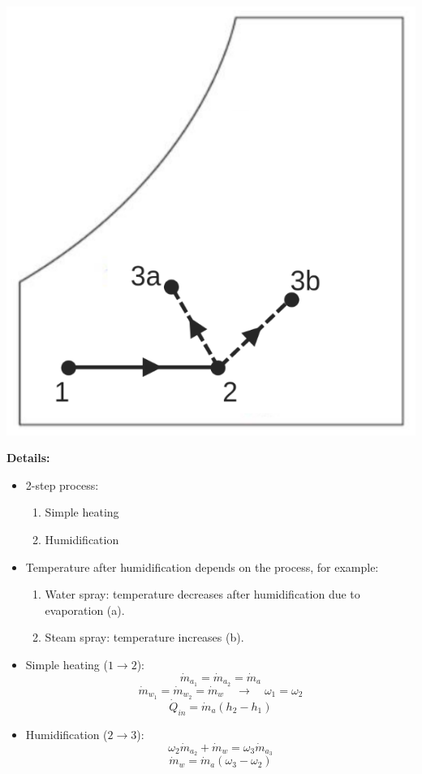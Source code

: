 \documentclass[11pt]{article}
\begin{document}
\begin{center}
\includegraphics[scale=0.8]{./images/heating-with-humidification-psychrometric-chart.png}
\end{center}

\textbf{Details:}
\begin{itemize}
\item 2-step process:
\begin{enumerate}
\item Simple heating
\item Humidification
\end{enumerate}
\item Temperature after humidification depends on the process, for example:
\begin{enumerate}
\item Water spray: temperature decreases after humidification due to evaporation (a).
\item Steam spray: temperature increases (b).
\end{enumerate}
\item Simple heating (\(1 \rightarrow 2\)):
\[\dot{m}_{a_1} = \dot{m}_{a_2} = \dot{m}_a\]
\[\dot{m}_{w_1} = \dot{m}_{w_2} = \dot{m}_w \quad \rightarrow \quad \omega_1 = \omega_2\]
\[\dot{Q}_{in} = \dot{m}_a (h_2 - h_1)\]
\item Humidification (\(2 \rightarrow 3\)):
\[\omega_2 \dot{m}_{a_2} + \dot{m}_w = \omega_3 \dot{m}_{a_3}\]
\[\dot{m}_w = \dot{m}_a (\omega_3 - \omega_2)\]
\end{itemize}
\end{document}
